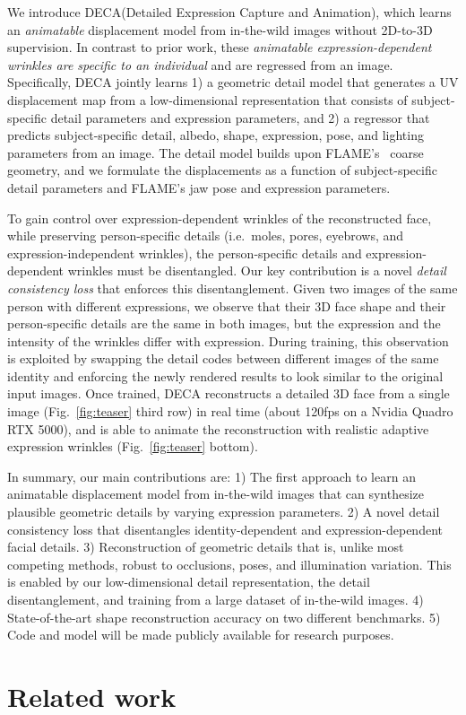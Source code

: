 \documentclass[final]{cvpr}
\newcommand{\modelname}{DECA\xspace}
\begin{document}
We introduce \modelname (Detailed Expression Capture and Animation), which learns an {\em animatable} displacement model from in-the-wild images without 2D-to-3D supervision. 
In contrast to prior work, these {\em animatable expression-dependent wrinkles are specific to an individual} and are regressed from an image.
Specifically, \modelname jointly learns
1) a geometric detail model that generates a UV displacement map from a low-dimensional representation that consists of subject-specific detail parameters and expression parameters, and
2) a regressor that predicts subject-specific detail, albedo, shape, expression, pose, and lighting parameters from an image. 
The detail model builds upon FLAME's~\cite{FLAME2017} coarse geometry, and we formulate the displacements as a function of subject-specific detail parameters and FLAME's jaw pose and expression parameters.


To gain control over expression-dependent wrinkles of the reconstructed face, while preserving person-specific details (i.e.~moles, pores, eyebrows, and expression-independent wrinkles), the person-specific details and expression-dependent wrinkles must be disentangled. 
Our key contribution is a novel {\em detail consistency loss} that enforces this disentanglement.
Given two images of the same person with different expressions, we observe that their 3D face shape and their person-specific details are the same in both images, but the expression and the intensity of the wrinkles differ with expression.
During training, this observation is exploited by swapping the detail codes between different images of the same identity and enforcing the newly rendered results to look similar to the original input images. 
Once trained, \modelname reconstructs a detailed 3D face from a single image (Fig.~\ref{fig:teaser} third row) in real time (about 120fps on a Nvidia Quadro RTX 5000), and is able to animate the reconstruction with realistic adaptive expression wrinkles (Fig.~\ref{fig:teaser} bottom). 

In summary, our main contributions are:
1) The first approach to learn an animatable displacement model from in-the-wild images that can synthesize plausible geometric details by varying expression parameters. 
2) A novel detail consistency loss that disentangles identity-dependent and expression-dependent facial details. 
3) Reconstruction of geometric details that is, unlike most competing methods, robust to occlusions, poses, and illumination variation.
This is enabled by our low-dimensional detail representation, the detail disentanglement, and training from a large dataset of in-the-wild images.
4) State-of-the-art shape reconstruction accuracy on two different benchmarks. 
5) Code and model will be made publicly available for research purposes. \section{Related work}
\end{document}
